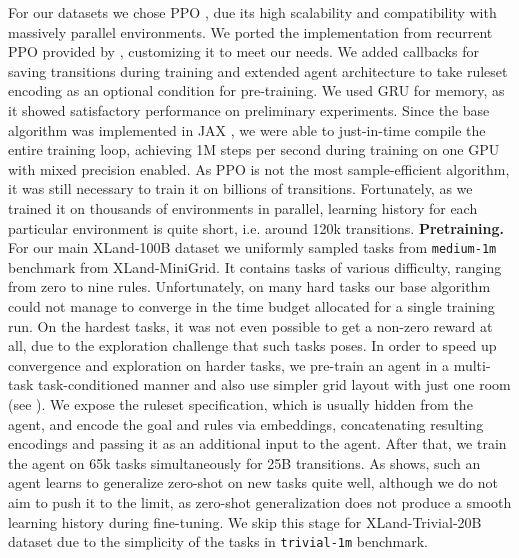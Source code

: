 \documentclass{article}
\begin{document}
For our datasets we chose PPO \citep{schulman2017proximal}, due its high scalability and compatibility with massively parallel environments. We ported the implementation from recurrent PPO provided by \citep{nikulin2023xland}, customizing it to meet our needs. We added callbacks for saving transitions during training and extended agent architecture to take ruleset encoding as an optional condition for pre-training. We used GRU \citep{cho2014properties} for memory, as it showed satisfactory performance on preliminary experiments. Since the base algorithm was implemented in JAX \citep{jax2018github}, we were able to just-in-time compile the entire training loop, achieving 1M steps per second during training on one GPU with mixed precision enabled. As PPO is not the most sample-efficient algorithm, it was still necessary to train it on billions of transitions. Fortunately, as we trained it on thousands of environments in parallel, learning history for each particular environment is quite short, i.e. around 120k transitions.
\textbf{Pretraining.} For our main XLand-100B dataset we uniformly sampled tasks from \texttt{medium-1m} benchmark from XLand-MiniGrid. It contains tasks of various difficulty, ranging from zero to nine rules.
Unfortunately, on many hard tasks our base algorithm could not manage to converge in the time budget allocated for a single training run. On the hardest tasks, it was not even possible to get a non-zero reward at all, due to the exploration challenge that such tasks poses. In order to speed up convergence and exploration on harder tasks, we pre-train an agent in a multi-task task-conditioned manner and also use simpler grid layout with just one room (see ). We expose the ruleset specification, which is usually hidden from the agent, and encode the goal and rules via embeddings, concatenating resulting encodings and passing it as an additional input to the agent. After that, we train the agent on 65k tasks simultaneously for 25B transitions. As  shows, such an agent learns to generalize zero-shot on new tasks quite well, although we do not aim to push it to the limit, as zero-shot generalization does not produce a smooth learning history during fine-tuning. We skip this stage for XLand-Trivial-20B dataset due to the simplicity of the tasks in \texttt{trivial-1m} benchmark.
\end{document}
